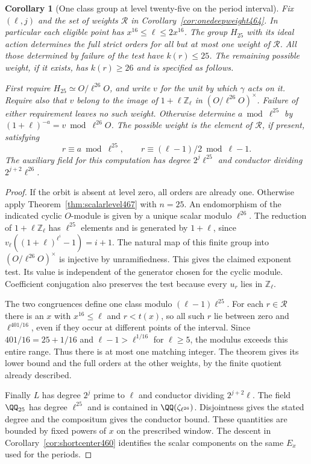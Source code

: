 \documentclass[a4paper,11pt]{article}
\newtheorem{corollary}[proposition]{Corollary}
\theoremstyle{definition}
\theoremstyle{remark}
\newcommand{\ZZ}{\mathbb Z}\newcommand{\ord}{\operatorname{ord}}
\numberwithin{equation}{section}
\begin{document}
\begin{corollary}[One class group at level twenty-five on the period interval]\leavevmode
\label{cor:leveltwentyfive467}
Fix \((\ell,j)\) and the set of weights \(\mathcal R\) in
Corollary~\ref{cor:onedeepweight464}. In particular each
eligible point has \(x^{16}\le\ell\le2x^{16}\). The group
\(H_{25}\) with its ideal action determines the full strict
orders for all but at most one weight of \(\mathcal R\).
All those determined by failure of the test have \(k(r)\le25\).
The remaining possible weight, if it exists, has \(k(r)\ge26\)
and is specified as follows.

First require \(H_{25}\simeq O/\ell^{26}O\), and write \(v\)
for the unit by which \(\gamma\) acts on it. Require also that
\(v\) belong to the image of \(1+\ell\ZZ_\ell\) in
\((O/\ell^{26}O)^\times\). Failure of either requirement leaves
no such weight. Otherwise determine \(a\bmod\ell^{25}\) by
\((1+\ell)^{-a}=v\bmod\ell^{26}O\). The possible weight is
the element of \(\mathcal R\), if present, satisfying
\[
          r\equiv a\bmod{\ell^{25}},\qquad
          r\equiv(\ell-1)/2\bmod{\ell-1}.
\]
The auxiliary field for this computation has degree
\(2^j\ell^{25}\) and conductor dividing \(2^{j+2}\ell^{26}\).
\end{corollary}
\begin{proof}
If the orbit is absent at level zero, all orders are already
one. Otherwise apply Theorem~\ref{thm:scalarlevel467} with
\(n=25\). An endomorphism of the indicated cyclic \(O\)-module
is given by a unique scalar modulo \(\ell^{26}\). The reduction
of \(1+\ell\ZZ_\ell\) has \(\ell^{25}\) elements and is
generated by \(1+\ell\), since
\(v_\ell((1+\ell)^{\ell^i}-1)=i+1\). The natural map of this
finite group into \((O/\ell^{26}O)^\times\) is injective by
unramifiedness. This gives the claimed exponent test. Its value
is independent of the generator chosen for the cyclic module.
Coefficient conjugation also preserves the test because every
\(u_r\) lies in \(\ZZ_\ell\).

The two congruences define one class modulo
\((\ell-1)\ell^{25}\). For each \(r\in\mathcal R\) there is
an \(x\) with \(x^{16}\le\ell\) and \(r<t(x)\), so all
such \(r\) lie between zero and \(\ell^{401/16}\), even if
they occur at different points of the interval. Since
\(401/16=25+1/16\) and \(\ell-1>\ell^{1/16}\) for
\(\ell\ge5\), the modulus exceeds this entire range. Thus
there is at most one matching integer. The theorem gives
its lower bound and the full orders at the other weights, by
the finite quotient already described.

Finally \(L\) has degree \(2^j\) prime to \(\ell\) and
conductor dividing \(2^{j+2}\ell\).
The field \(\QQ_{25}\) has degree \(\ell^{25}\) and is
contained in \(\QQ(\zeta_{\ell^{26}})\). Disjointness gives the
stated degree and the compositum gives the conductor bound.
These quantities are bounded by fixed powers of \(x\) on the
prescribed window. The descent in
Corollary~\ref{cor:shortcenter460} identifies the scalar
components on the same \(E_x\) used for the periods.
\end{proof}
\end{document}
